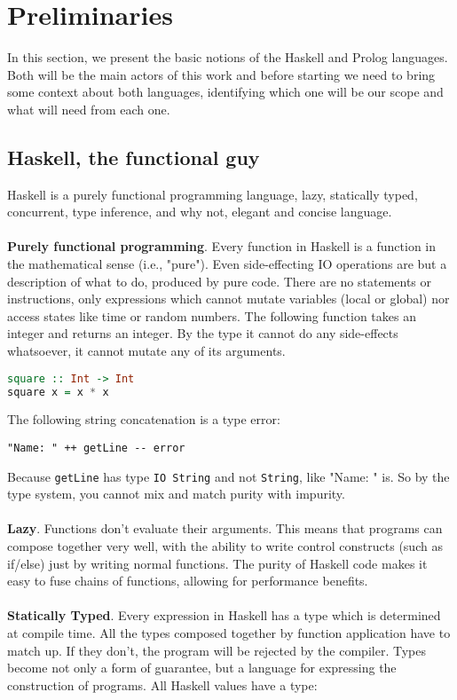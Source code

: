 \chapter{Preliminaries}
In this section, we present the basic notions of the Haskell and Prolog languages. Both will be the main actors of this work and before starting we need to bring some context about both languages, identifying which one will be our scope and what will need from each one.
\section{Haskell, the functional guy}
Haskell is a purely functional programming language, lazy, statically typed, concurrent, type inference, and why not, elegant and concise language.\\\\
\textbf{Purely functional programming}. Every function in Haskell is a function in the mathematical sense (i.e., "pure"). Even side-effecting IO operations are but a description of what to do, produced by pure code. There are no statements or instructions, only expressions which cannot mutate variables (local or global) nor access states like time or random numbers. The following function takes an integer and returns an integer. By the type it cannot do any side-effects whatsoever, it cannot mutate any of its arguments.
\begin{lstlisting}[language=Haskell, caption=Purely Functional Programming]
square :: Int -> Int
square x = x * x
\end{lstlisting}
The following string concatenation is a type error:
\begin{lstlisting}[caption=Purely Functional Programming]
"Name: " ++ getLine -- error
\end{lstlisting}
Because \texttt{getLine} has type \texttt{IO String} and not \texttt{String}, like "Name: " is. So by the type system, you cannot mix and match purity with impurity.\\\\
\textbf{Lazy}. Functions don't evaluate their arguments. This means that programs can compose together very well, with the ability to write control constructs (such as if/else) just by writing normal functions. The purity of Haskell code makes it easy to fuse chains of functions, allowing for performance benefits.\\\\
\textbf{Statically Typed}. Every expression in Haskell has a type which is determined at compile time. All the types composed together by function application have to match up. If they don't, the program will be rejected by the compiler. Types become not only a form of guarantee, but a language for expressing the construction of programs. All Haskell values have a type:
